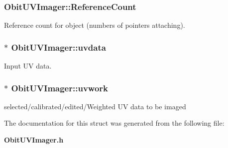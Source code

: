 \subsubsection{ {\bf Obit\-UVImager::Reference\-Count}}\label{structObitUVImager_o2}


Reference count for object (numbers of pointers attaching). 

\subsubsection{$\ast$ {\bf Obit\-UVImager::uvdata}}\label{structObitUVImager_o4}


Input UV data. 

\subsubsection{$\ast$ {\bf Obit\-UVImager::uvwork}}\label{structObitUVImager_o5}


selected/calibrated/edited/Weighted UV data to be imaged 



The documentation for this struct was generated from the following file:\begin{CompactItemize}
\item 
{\bf Obit\-UVImager.h}\end{CompactItemize}
